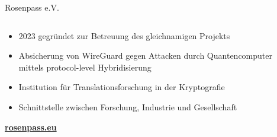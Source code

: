 \begin{frame}{Rosenpass e.V.}
  \begin{columns}[fullwidth,c]
  	\hspace*{.25\LeftSlideIndent}
    \begin{column}{.5\linewidth}
      \begin{itemize}
        \item 2023 gegründet zur Betreuung des gleichnamigen Projekts
        \vfill
        \item Absicherung von WireGuard gegen Attacken durch Quantencomputer mittels protocol-level Hybridisierung
        \item Institution für Translationsforschung in der Kryptografie
        \vfill
        \item Schnittstelle zwischen Forschung, Industrie und Gesellschaft
      \end{itemize}
      \bigskip
      \textbf{\url{rosenpass.eu}}
    \end{column}%
    \begin{column}{.5\linewidth}
    \end{column}%
  \end{columns}
\end{frame}
